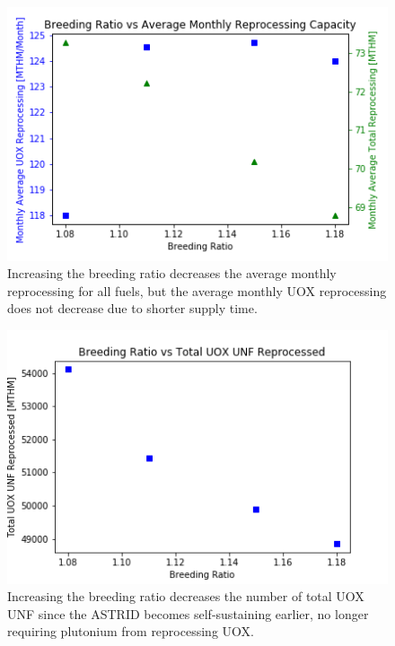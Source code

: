 \begin{figure}[htbp!]
    \begin{center}
        \includegraphics[scale=0.6]{./images/sensitivity/br.png}
    \end{center}
    \caption{Increasing the breeding ratio decreases the average monthly reprocessing for all fuels,
             but the average monthly \gls{UOX} reprocessing does not decrease due to shorter supply time. }
    \label{fig:br_rep}
\end{figure}


\begin{figure}[htbp!]
    \begin{center}
        \includegraphics[scale=0.6]{./images/sensitivity/br_uox.png}
    \end{center}
    \caption{Increasing the breeding ratio decreases the number of total \gls{UOX} \gls{UNF}
             since the \gls{ASTRID} becomes self-sustaining earlier, no longer requiring
             plutonium from reprocessing \gls{UOX}.}
    \label{fig:eu_tail}
\end{figure}


